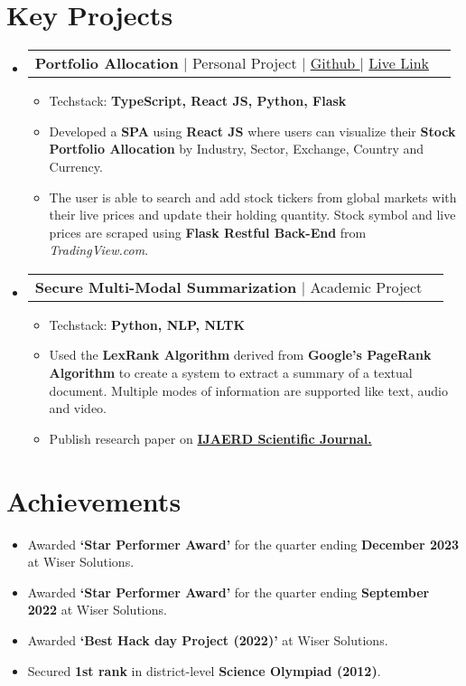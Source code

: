 \documentclass[letterpaper,11pt]{article}
\makeatletter
\newcommand{\resumeItem}[1]{
    \item
        \small{#1}
}
\newcommand{\resumeProjectHeading}[1]{
    \item
        \begin{tabular*}{1.0\textwidth}{l@{\extracolsep{\fill}}r}
        \small#1\\
        \end{tabular*}\vspace{-4pt}
}
\newcommand{\resumeSubHeadingListStart}{\begin{itemize}[leftmargin=0.0in, label={}]}
\newcommand{\resumeSubHeadingListEnd}{\end{itemize}}
\newcommand{\resumeItemListStart}{\begin{itemize}}
\newcommand{\resumeItemListEnd}{\end{itemize}}
\makeatother
\begin{document}
\section{Key Projects}
\resumeSubHeadingListStart
    \resumeProjectHeading
    {\textbf{Portfolio Allocation} $|$ Personal Project $|$ \href{https://github.com/Akkisdiary/portfolio-allocation}{Github \faExternalLink*} $|$ \href{https://portfolio-allocation.netlify.app/}{Live Link \faExternalLink*}}
        \resumeItemListStart
            \resumeItem
            {Techstack: \textbf{TypeScript, React JS, Python, Flask}}
            \resumeItem
            {Developed a \textbf{SPA} using \textbf{React JS} where users can visualize their \textbf{Stock Portfolio Allocation} by Industry, Sector, Exchange, Country and Currency.}
            \resumeItem
            {The user is able to search and add stock tickers from global markets with their live prices and update their holding quantity. Stock symbol and live prices are scraped using \textbf{Flask Restful Back-End} from \textit{TradingView.com}.}
        \resumeItemListEnd
        \resumeProjectHeading
        {\textbf{Secure Multi-Modal Summarization} $|$ Academic Project}
        \resumeItemListStart
            \resumeItem
            {Techstack: \textbf{Python, NLP, NLTK}}
            \resumeItem
            {Used the \textbf{LexRank Algorithm} derived from \textbf{Google's PageRank Algorithm} to create a system to extract a summary of a textual document. Multiple modes of information are supported like text, audio and video.}
            \resumeItem
            {Publish research paper on \href{https://drive.google.com/file/d/1Ik8ADmgQ161ozwnP4DED0riZerrP4JPw/view?usp=sharing}{\textbf{IJAERD Scientific Journal.} \faExternalLink*}}
        \resumeItemListEnd
\resumeSubHeadingListEnd


\section{Achievements}
\resumeItemListStart
    \resumeItem
    {Awarded \textbf{`Star Performer Award'} for the quarter ending \textbf{December 2023} at Wiser Solutions. \href{https://drive.google.com/file/d/11RvsYKlJ9UAnp2LHTLOc-FF-gGJzbBXb/view?usp=sharing}{\faExternalLink*}}
    \resumeItem
    {Awarded \textbf{`Star Performer Award'} for the quarter ending \textbf{September 2022} at Wiser Solutions. \href{https://drive.google.com/file/d/1SLFl3xMEQQykWYrRkAzT4aPqpjl47jUr/view?usp=share_link}{\faExternalLink*}}
    \resumeItem
    {Awarded \textbf{`Best Hack day Project (2022)'} at Wiser Solutions.}
    \resumeItem
    {Secured \textbf{1st rank} in district-level \textbf{Science Olympiad (2012)}.}
\resumeItemListEnd
\end{document}
